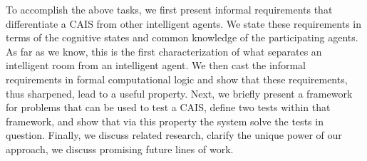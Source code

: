 To accomplish the above tasks, we first present informal requirements
that differentiate a CAIS from other intelligent agents.  We state
these requirements in terms of the cognitive states and common
knowledge of the participating agents.  As far as we know, this is the
first characterization of what separates an intelligent room from an
intelligent agent.  We then cast the informal requirements in formal
computational logic and show that these requirements, thus sharpened,
lead to a useful property.  Next, we briefly present a framework for
problems that can be used to test a CAIS, define two tests within that
framework, and show that via this property the system solve the tests
in question.  Finally, we discuss related research, clarify the unique
power of our approach, we discuss promising future lines of work.
